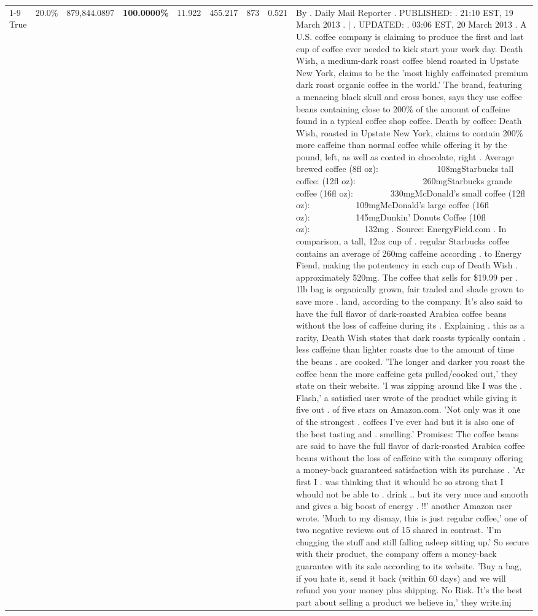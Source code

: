 \begin{table}[H]
{\begin{tabular}{lllrlllll}
\cline{1-9}
True & 20.0\% & 879,844.0897 & \bfseries \color{red} 100.0000\% & 11.922 & 455.217 & 873 & 0.521 & By . Daily Mail Reporter . PUBLISHED: . 21:10 EST, 19 March 2013 . | . UPDATED: . 03:06 EST, 20 March 2013 . A U.S. coffee company is claiming to produce the first and last cup of coffee ever needed to kick start your work day. Death Wish, a medium-dark roast coffee blend roasted in Upstate New York, claims to be the 'most highly caffeinated premium dark roast organic coffee in the world.' The brand, featuring a menacing black skull and cross bones, says they use coffee beans containing close to 200\% of the amount of caffeine found in a typical coffee shop coffee. Death by coffee: Death Wish, roasted in Upstate New York, claims to contain 200\% more caffeine than normal coffee while offering it by the pound, left, as well as coated in chocolate, right . Average brewed coffee (8fl oz):              108mgStarbucks tall coffee: (12fl oz):                260mgStarbucks grande coffee (16fl oz):         330mgMcDonald's small coffee (12fl oz):           109mgMcDonald's large coffee (16fl oz):           145mgDunkin' Donuts Coffee (10fl oz):             132mg . Source: EnergyField.com . In comparison, a tall, 12oz cup of . regular Starbucks coffee contains an average of 260mg caffeine according . to Energy Fiend, making the potentency in each cup of Death Wish . approximately 520mg. The coffee that sells for \$19.99 per . 1lb bag is organically grown, fair traded and shade grown to save more . land, according to the company. It's also said to have the full flavor of dark-roasted Arabica coffee beans without the loss of caffeine during its . Explaining . this as a rarity, Death Wish states that dark roasts typically contain . less caffeine than lighter roasts due to the amount of time the beans . are cooked. 'The longer and darker you roast the coffee bean the more caffeine gets pulled/cooked out,' they state on their website. 'I was zipping around like I was the . Flash,' a satisfied user wrote of the product while giving it five out . of five stars on Amazon.com. 'Not only was it one of the strongest . coffees I've ever had but it is also one of the best tasting and . smelling.’ Promises: The coffee beans are said to have the full flavor of dark-roasted Arabica coffee beans without the loss of caffeine with the company offering a money-back guaranteed satisfaction with its purchase . 'Ar first I . was thinking that it whould be so strong that I whould not be able to . drink .. but its very nuce and smooth and gives a big boost of energy . !!' another Amazon user wrote. 'Much to my dismay, this is just regular coffee,' one of two negative reviews out of 15 shared in contrast. 'I'm chugging the stuff and still falling asleep sitting up.' So secure with their product, the company offers a money-back guarantee with its sale according to its website. 'Buy a bag, if you hate it, send it back (within 60 days) and we will refund you your money plus shipping. No Risk. It’s the best part about selling a product we believe in,' they write.inį \\

\end{tabular}}
\end{table}
